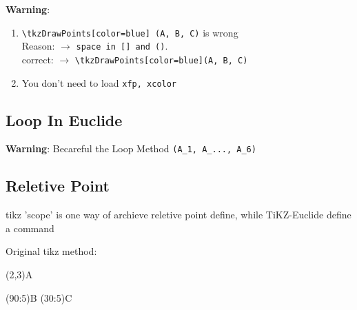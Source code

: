 \documentclass[12pt]{article}
\def\lis{\ding{227}\;}
\begin{document}
\vspace*{4em}
\textbf{Warning}:
\begin{enumerate}[\lis 1)]
    \item \verb|\tkzDrawPoints[color=blue] (A, B, C)| is wrong \\
        Reason: $\longrightarrow$ \verb|space in [] and ()|.\\
        correct: $\longrightarrow$ \verb|\tkzDrawPoints[color=blue](A, B, C)|
    \item You don't need to load \verb|xfp, xcolor|
\end{enumerate}  


\clearpage
\subsection{Loop In Euclide}
\begin{multicols}{2}
    \begin{bytes}
    \end{bytes}
    \columnbreak
\end{multicols}

\textbf{Warning}: Becareful the Loop Method \verb|(A_1, A_..., A_6)|


\subsection{Reletive Point}
tikz 'scope' is one way of archieve reletive point define, while 
TiKZ-Euclide define a command

\lis\quad Original tikz method:
\begin{bytes}
\tkzDefPoint(2,3){A}
\begin{scope}[shift=(A)]
    \tkzDefPoint(90:5){B}
    \tkzDefPoint(30:5){C}
\end{scope}
\end{bytes}
\end{document}
